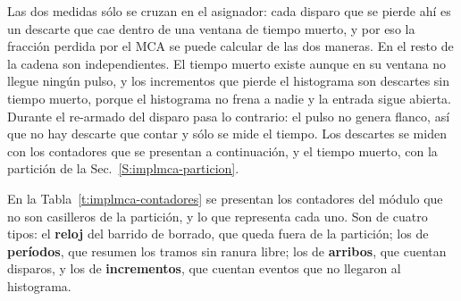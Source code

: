 Las dos medidas sólo se cruzan en el asignador: cada disparo que se pierde ahí
es un descarte que cae dentro de una ventana de tiempo muerto, y por eso la
fracción perdida por el MCA se puede calcular de las dos maneras. En el resto de
la cadena son independientes. El tiempo muerto existe aunque en su ventana no
llegue ningún pulso, y los incrementos que pierde el histograma son descartes
sin tiempo muerto, porque el histograma no frena a nadie y la entrada sigue
abierta. Durante el re-armado del disparo pasa lo contrario: el pulso no genera
flanco, así que no hay descarte que contar y sólo se mide el tiempo. Los
descartes se miden con los contadores que se presentan a continuación, y el
tiempo muerto, con la partición de la Sec.~\ref{S:implmca-particion}.

En la Tabla~\ref{t:implmca-contadores} se presentan los contadores del módulo
que no son casilleros de la partición, y lo que representa cada uno. Son de cuatro
tipos: el \textbf{reloj} del barrido de borrado, que queda fuera de la partición;
los de \textbf{períodos}, que resumen los tramos sin ranura libre; los de
\textbf{arribos}, que cuentan disparos, y los de \textbf{incrementos}, que
cuentan eventos que no llegaron al histograma.

